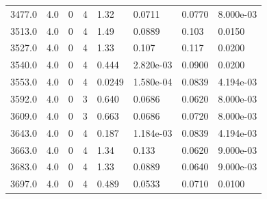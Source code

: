 \documentclass[preview]{standalone}
\begin{document}
{{{{{\begin{tabular}{L{1.2cm}C{1.2cm} C{0.3cm}C{0.5cm} C{1.4cm}C{1.4cm} C{1.4cm}C{1.4cm}}
  3477.0  &   4.0  & 0     &  4 &  1.32  & 0.0711  & 0.0770 &  8.000e-03   \\ 
  3513.0  &   4.0  & 0     &  4 &  1.49  & 0.0889  & 0.103 &  0.0150   \\ 
  3527.0  &   4.0  & 0     &  4 &  1.33  & 0.107  & 0.117 &  0.0200   \\ 
  3540.0  &   4.0  & 0     &  4 &  0.444  & 2.820e-03  & 0.0900 &  0.0200   \\ 
  3553.0  &   4.0  & 0     &  4 &  0.0249  & 1.580e-04  & 0.0839 &  4.194e-03   \\ 
  3592.0  &   4.0  & 0     &  3 &  0.640  & 0.0686  & 0.0620 &  8.000e-03   \\ 
  3609.0  &   4.0  & 0     &  3 &  0.663  & 0.0686  & 0.0720 &  8.000e-03   \\ 
  3643.0  &   4.0  & 0     &  4 &  0.187  & 1.184e-03  & 0.0839 &  4.194e-03   \\ 
  3663.0  &   4.0  & 0     &  4 &  1.34  & 0.133  & 0.0620 &  9.000e-03   \\ 
  3683.0  &   4.0  & 0     &  4 &  1.33  & 0.0889  & 0.0640 &  9.000e-03   \\ 
  3697.0  &   4.0  & 0     &  4 &  0.489  & 0.0533  & 0.0710 &  0.0100   \\ 
\hline 
\end{tabular} 

}}}}}
\end{document}
